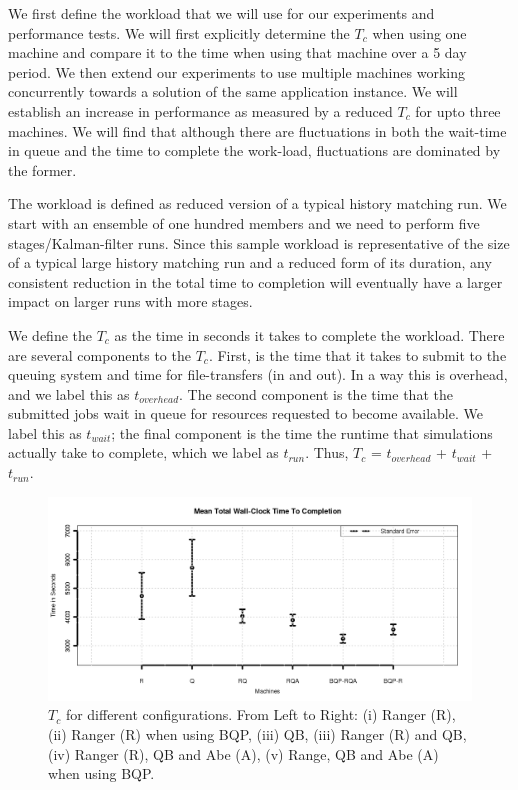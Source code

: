 \documentclass{sig-alternate}
\newcommand{\tc}{$T_c$ }
\newcommand{\tcnsp}{$T_c$}
\begin{document}
We first define the workload that we will use for our experiments and
performance tests. We will first explicitly determine the \tc when
using one machine and compare it to the time when using that machine
over a 5 day period. We then extend our experiments to use multiple
machines working concurrently towards a solution of the same
application instance.  We will establish an increase in performance as
measured by a reduced \tc for upto three machines.  We will find that
although there are fluctuations in both the wait-time in queue and the
time to complete the work-load, fluctuations are dominated by the
former.

The workload is defined as reduced version of a typical history
matching run. We start with an ensemble of one hundred members and we
need to perform five stages/Kalman-filter runs. Since this sample
workload is representative of the size of a typical large history
matching run and a reduced form of its duration, any consistent
reduction in the total time to completion will eventually have a
larger impact on larger runs with more stages.

We define the \tc as the time in seconds it takes to complete the
workload. There are several components to the \tcnsp. First, is the
time that it takes to submit to the queuing system and time for
file-transfers (in and out). In a way this is overhead, and we label
this as $t_{overhead}$.  The second component is the time that the
submitted jobs wait in queue for resources requested to become
available. We label this as $t_{wait}$; the final component is the
time the runtime that simulations actually take to complete, which we
label as $t_{run}$. Thus, \tc = $t_{overhead}$ + $t_{wait}$ +
$t_{run}$.

\begin{figure}
\begin{center}
\includegraphics[scale=0.28]{./figures/Figure7.png}
\end{center}
\caption{\tc for different configurations.  From Left to Right: (i)
  Ranger (R), (ii) Ranger (R) when using BQP, (iii) QB, (iii) Ranger (R)
  and QB, (iv) Ranger (R), QB and Abe (A), (v) Range, QB and Abe (A) when
  using BQP.}
\label{fig:results}
\end{figure}
\end{document}
